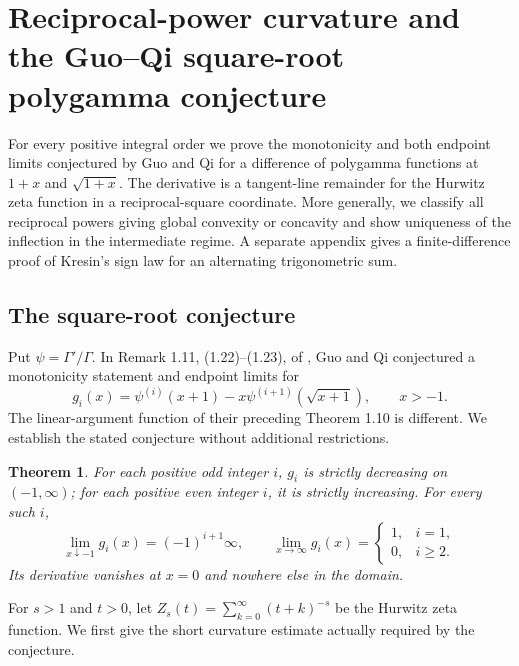 \documentclass[11pt,a4paper]{article}
\numberwithin{equation}{section}
\newtheorem{theorem}{Theorem}[section]
\theoremstyle{definition}
\theoremstyle{remark}
\newenvironment{sectionabstract}{\par\smallskip\begingroup\small\noindent}{\par\endgroup\medskip}
\begin{document}
\par\endgroup

\begingroup
\newcommand{\R}{\mathbb R}
\newcommand{\Z}{\mathbb Z}
\section{\texorpdfstring{Reciprocal-power curvature and the Guo--Qi square-root polygamma conjecture}{Reciprocal-power curvature and the Guo--Qi square-root polygamma conjecture}}\label{section:r33heisei}
\par\medskip


\begin{sectionabstract}
For every positive integral order we prove the monotonicity and both endpoint limits conjectured by Guo and Qi for a difference of polygamma functions at $1+x$ and $\sqrt{1+x}$. The derivative is a tangent-line remainder for the Hurwitz zeta function in a reciprocal-square coordinate. More generally, we classify all reciprocal powers giving global convexity or concavity and show uniqueness of the inflection in the intermediate regime. A separate appendix gives a finite-difference proof of Kresin's sign law for an alternating trigonometric sum.
\end{sectionabstract}
\subsection{The square-root conjecture}
Put $\psi=\Gamma'/\Gamma$. In Remark 1.11, (1.22)--(1.23), of \cite{r33heisei:GQ}, Guo and Qi conjectured a monotonicity statement and endpoint limits for
\[
 g_i(x)=\psi^{(i)}(x+1)-x\psi^{(i+1)}(\sqrt{x+1}),\qquad x>-1.
\]
The linear-argument function of their preceding Theorem 1.10 is different. We establish the stated conjecture without additional restrictions.
\begin{theorem}\label{r33heisei:gq}
For each positive odd integer $i$, $g_i$ is strictly decreasing on $(-1,\infty)$; for each positive even integer $i$, it is strictly increasing. For every such $i$,
\[
 \lim_{x\downarrow-1}g_i(x)=(-1)^{i+1}\infty,\qquad
 \lim_{x\to\infty}g_i(x)=
 \begin{cases}1,&i=1,\\0,&i\ge2.\end{cases}
\]
Its derivative vanishes at $x=0$ and nowhere else in the domain.
\end{theorem}
For $s>1$ and $t>0$, let $Z_s(t)=\sum_{k=0}^\infty(t+k)^{-s}$ be the Hurwitz zeta function. We first give the short curvature estimate actually required by the conjecture.
\end{document}
